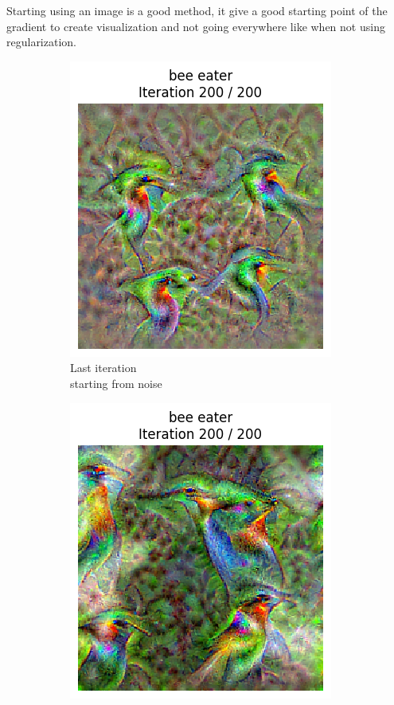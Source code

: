 Starting using an image is a good method, it give a good starting point of the gradient to create visualization and not going everywhere like when not using regularization.
\begin{figure}[H]
    \centering
    \begin{subfigure}{.33\textwidth}
        \centering
        \includegraphics[width=.7\linewidth]{figs/2b/SqueezeNet/SqueezeNet_bird_animated_reg++_last_frame.png}
        \caption{Last iteration\\starting from noise}
        \label{fig:class_viz_start_image:png_noise}
    \end{subfigure}%
    \begin{subfigure}{.33\textwidth}
        \centering
        \includegraphics[width=.7\linewidth]{figs/2b/SqueezeNet/SqueezeNet_bird_animated_same_init_img_reg++_last_frame.png}

\end{subfigure}
\end{figure}
